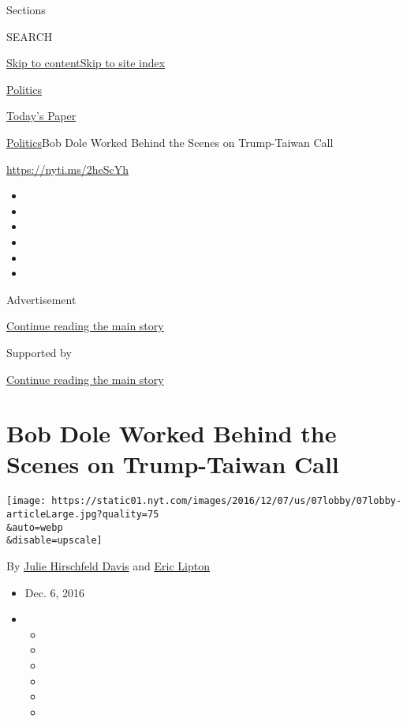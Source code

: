 Sections

SEARCH

\protect\hyperlink{site-content}{Skip to
content}\protect\hyperlink{site-index}{Skip to site index}

\href{https://www.nytimes.com/section/politics}{Politics}

\href{https://myaccount.nytimes.com/auth/login?response_type=cookie\&client_id=vi}{}

\href{https://www.nytimes.com/section/todayspaper}{Today's Paper}

\href{/section/politics}{Politics}\textbar{}Bob Dole Worked Behind the
Scenes on Trump-Taiwan Call

\url{https://nyti.ms/2heScYh}

\begin{itemize}
\item
\item
\item
\item
\item
\item
\end{itemize}

Advertisement

\protect\hyperlink{after-top}{Continue reading the main story}

Supported by

\protect\hyperlink{after-sponsor}{Continue reading the main story}

\hypertarget{bob-dole-worked-behind-the-scenes-on-trump-taiwan-call}{%
\section{Bob Dole Worked Behind the Scenes on Trump-Taiwan
Call}\label{bob-dole-worked-behind-the-scenes-on-trump-taiwan-call}}

\texttt{[image: https://static01.nyt.com/images/2016/12/07/us/07lobby/07lobby-articleLarge.jpg?quality=75\\\&auto=webp\\\&disable=upscale]}

By \href{https://www.nytimes.com/by/julie-hirschfeld-davis}{Julie
Hirschfeld Davis} and \href{http://www.nytimes.com/by/eric-lipton}{Eric
Lipton}

\begin{itemize}
\item
  Dec. 6, 2016
\item
  \begin{itemize}
  \item
  \item
  \item
  \item
  \item
  \item
  \end{itemize}
\end{itemize}

